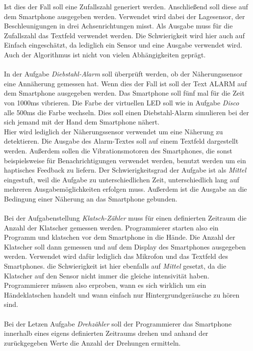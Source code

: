 \documentclass[11pt,a4paper]{report}
\begin{document}
Ist dies der Fall soll eine Zufallszahl generiert werden.
Anschließend soll diese auf dem Smartphone ausgegeben werden.
Verwendet wird dabei der Lagesensor, der Beschleunigungen in drei Achsenrichtungen misst.
Als Ausgabe muss für die Zufallszahl das Textfeld verwendet werden.
Die Schwierigkeit wird hier auch auf Einfach eingeschätzt, da lediglich ein Sensor und eine Ausgabe verwendet wird.
Auch der Algorithmus ist nicht von vielen Abhängigkeiten geprägt.
\\\\
In der Aufgabe \textit{Diebstahl-Alarm} soll überprüft werden, ob der Näherungssensor eine Annäherung gemessen hat.
Wenn dies der Fall ist soll der Text \glqq ALARM\grqq{} auf dem Smartphone ausgegeben werden.
Das Smartphone soll fünf mal für die Zeit von 1000ms vibrieren.
Die Farbe der virtuellen LED soll wie in Aufgabe \textit{Disco} alle 500ms die Farbe wechseln.
Dies soll einen Diebstahl-Alarm simulieren bei der sich jemand mit der Hand dem Smartphone nähert.
\\
Hier wird lediglich der Näherungssensor verwendet um eine Näherung zu detektieren.
Die Ausgabe des Alarm-Textes soll auf einem Textfeld dargestellt werden.
Außerdem sollen die Vibrationsmotoren des Smartphones, die sonst beispielsweise für Benachrichtigungen verwendet werden, benutzt werden um ein haptisches Feedback zu liefern.
Der Schwierigkeitsgrad der Aufgabe ist als \textit{Mittel} eingestuft, weil die Aufgabe zu unterschiedlichen Zeit, unterschiedlich lang auf mehreren Ausgabemöglichkeiten erfolgen muss.
Außerdem ist die Ausgabe an die Bedingung einer Näherung an das Smartphone gebunden.
\\\\
Bei der Aufgabenstellung \textit{Klatsch-Zähler} muss für einen definierten Zeitraum die Anzahl der Klatscher gemessen werden.
Programmierer starten also ein Programm und klatschen vor dem Smartphone in die Hände.
Die Anzahl der Klatscher soll dann gemessen und auf dem Display des Smartphones ausgegeben werden.
Verwendet wird dafür lediglich das Mikrofon und das Textfeld des Smartphones.
die Schwierigkeit ist hier ebenfalls auf \textit{Mittel} gesetzt, da die Klatscher auf den Sensor nicht immer die gleiche intensivität haben.
Programmierer müssen also erproben, wann es sich wirklich um ein Händeklatschen handelt und wann einfach nur Hintergrundgeräusche zu hören sind.
\\\\
Bei der Letzen Aufgabe \textit{Drehzähler} soll der Programmierer das Smartphone innerhalb eines eigens definierten Zeitraums drehen und anhand der zurückgegeben Werte die Anzahl der Drehungen ermitteln.
\end{document}
